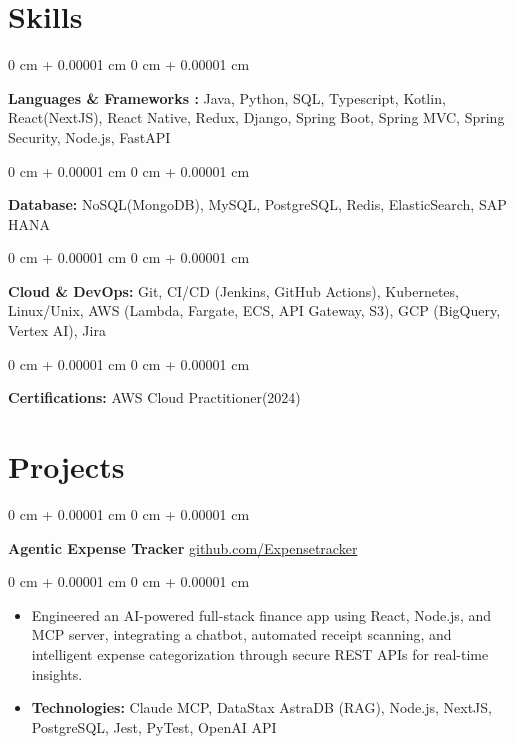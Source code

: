 \documentclass[10pt, letterpaper]{article}
\newenvironment{highlights}{
    \begin{itemize}[
        topsep=0.10 cm,
        parsep=0.10 cm,
        partopsep=0pt,
        itemsep=0pt,
        leftmargin=0 cm + 10pt
    ]
}{
    \end{itemize}
} %
\newenvironment{onecolentry}{
    \begin{adjustwidth}{
        0 cm + 0.00001 cm
    }{
        0 cm + 0.00001 cm
    }
}{
    \end{adjustwidth}
} %
\newenvironment{twocolentry}[2][]{
    \onecolentry
    \def\secondColumn{#2}
    \setcolumnwidth{\fill, 4.5 cm}
    \begin{paracol}{2}
}{
    \switchcolumn \raggedleft \secondColumn
    \end{paracol}
    \endonecolentry
} %
\begin{document}
    \section{Skills}
        \begin{onecolentry}
            \textbf{Languages \& Frameworks :} Java, Python, SQL, Typescript, Kotlin, React(NextJS), React Native, Redux, Django, Spring Boot, Spring MVC, Spring Security, Node.js, FastAPI
        \end{onecolentry}
        \begin{onecolentry}
            \textbf{Database:} NoSQL(MongoDB), MySQL, PostgreSQL, Redis, ElasticSearch, SAP HANA
        \end{onecolentry}
        \begin{onecolentry}
            \textbf{Cloud \& DevOps:} Git, CI/CD (Jenkins, GitHub Actions), Kubernetes, Linux/Unix, AWS (Lambda, Fargate, ECS, API Gateway, S3), GCP (BigQuery, Vertex AI), Jira
        \end{onecolentry}
        \begin{onecolentry}
            \textbf{Certifications:} AWS Cloud Practitioner(2024)
        \end{onecolentry}
      
    \section{Projects}
    
     \begin{twocolentry}{
            \href{https://github.com/ramchandra3101/ExpenseTracker_Backend}{github.com/Expensetracker}
        }
            \textbf{Agentic Expense Tracker}\end{twocolentry}

        \begin{onecolentry}
            \begin{highlights}
                \item Engineered an AI-powered full-stack finance app using React, Node.js, and MCP server, integrating a chatbot, automated receipt scanning, and intelligent expense categorization through secure REST APIs for real-time insights.
                \item \textbf{Technologies:} Claude MCP, DataStax AstraDB (RAG), Node.js, NextJS, PostgreSQL, Jest, PyTest, OpenAI API
            \end{highlights}
        \end{onecolentry}
    
\end{document}
